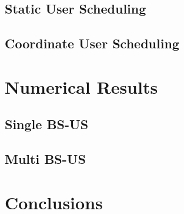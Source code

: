 \documentclass[a4paper,10pt,onecolumn]{article}
\begin{document}
\subsection{Static User Scheduling} \label{sus}



\subsection{Coordinate User Scheduling}\label{cus}



\section{Numerical Results}



\subsection{Single BS-US}



\subsection{Multi BS-US}



\section{Conclusions}





\end{document}
